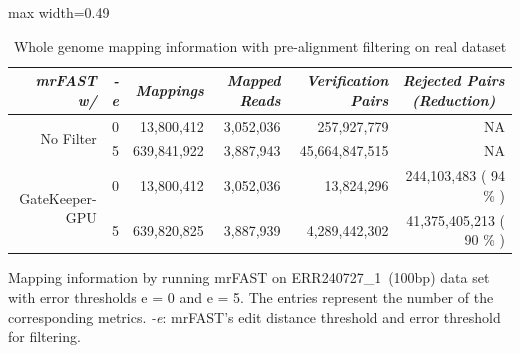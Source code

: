 \begin{table}[!htbp]
\caption{Whole genome mapping information with pre-alignment filtering on real dataset}
\label{tab:whole_gen}
\begin{adjustbox}{max width=0.49\textwidth}
\begin{tabular}{rr|r|r|r|r}
\multicolumn{1}{r}{\textit{mrFAST w/} } & \multicolumn{1}{r}{\textit{-e }} & \multicolumn{1}{r}{\textit{Mappings} } & \multicolumn{1}{r}{\textit{Mapped Reads }} & \multicolumn{1}{r}{\textit{Verification Pairs }} & \multicolumn{1}{c}{\textit{Rejected Pairs (Reduction) }}  \\ 
\hline
\multirow{2}{*}{No Filter}       \rule{0pt}{2ex}        & 0                               & 13,800,412                             & 3,052,036                                  & 257,927,779                                      & NA                                                        \\
                                        & 5                               & 639,841,922                            & 3,887,943                                  & 45,664,847,515                                   & NA                                                        \\ 
\hline
\multirow{2}{*}{GateKeeper-GPU}    \rule{0pt}{2ex}      & 0                               & 13,800,412                             & 3,052,036                                  & 13,824,296                                       & 244,103,483 ( 94 \% )                                     \\
                                        & 5                               & 639,820,825                            & 3,887,939                                  & 4,289,442,302                                    & 41,375,405,213 ( 90 \% )                                  \\
\hline
\end{tabular}
\end{adjustbox}
\begin{minipage}{0.49\textwidth}
\vspace*{0.2cm}
\scriptsize
Mapping information by running mrFAST on ERR240727\_1~(100bp) data set with error thresholds e = 0 and e = 5. The entries represent the number of the corresponding metrics. \textit{-e}: mrFAST's edit distance threshold and error threshold for filtering.
\end{minipage}
\end{table}

